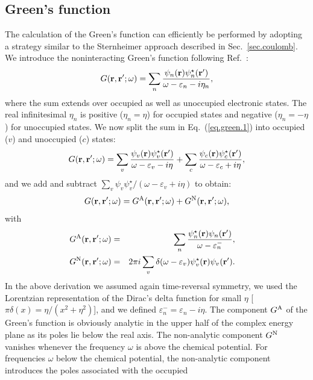 \documentclass[twocolumn,prb,showpacs,superscriptaddress]{revtex4}
\def\w{\omega}
\def\E{\varepsilon}
\def\r{{\bf r}}
\def\rp{{\bf r^\prime}}
\begin{document}
\subsection{Green's function}\label{sec.green}

The calculation of the Green's function can efficiently be performed 
by adopting a strategy similar to the Sternheimer approach
described in Sec.\ \ref{sec.coulomb}.
We introduce the noninteracting Green's function following Ref.\ :
  \begin{equation}\label{eq.green.1}
  G(\r,\rp;\w) = \sum_n \frac{\psi_n(\r)\psi_n^\star(\rp)}{\w-\E_n-i\eta_n},
  \end{equation}
where the sum extends over occupied as well as unoccupied electronic states.
The real infinitesimal $\eta_n$ is positive ($\eta_n=\eta$) 
for occupied states and negative ($\eta_n=-\eta$) for unoccupied states.\cite{hl,hl86,note.spinfactor}
We now split the sum in Eq.~(\ref{eq.green.1}) into occupied ($v$) and unoccupied ($c$) states:
  \begin{equation}\label{eq.green.2}
  G(\r,\rp;\w) = \sum_v \frac{\psi_v(\r)\psi_v^\star(\rp)}{\w-\E_v-i\eta}
  + \sum_c \frac{\psi_c(\r)\psi_c^\star(\rp)}{\w-\E_c+i\eta},
  \end{equation}
and we add and subtract $\sum_v \psi_v\psi_v^\star/(\w-\E_v+i\eta)$ to obtain:
  \begin{equation}\label{eq.green.split}
  G(\r,\rp;\w) = G^{\rm A}(\r,\rp;\w) + G^{\rm N}(\r,\rp;\w),
  \end{equation}
with
  \begin{eqnarray}\label{eq.green.split.2}
\!\!\!\!\!\!  G^{\rm A}(\r,\rp;\w) & =&  \sum_n \frac{\psi_n^\star(\r)\psi_n(\rp)}{\w-\E_n^-},  \\ 
\!\!\!\!\!\!  G^{\rm N}(\r,\rp;\w)  & = &  2\pi i \sum_v \delta(\w-\E_v) \psi_v^\star(\r)\psi_v(\rp). \label{eq.green.split.3} 
  \end{eqnarray}
In the above derivation we assumed again time-reversal symmetry, we used the Lorentzian representation of the Dirac's delta function 
for small $\eta$ [$\pi\delta(x)=\eta/(x^2+\eta^2)$], and we defined $\E_n^- = \E_n - i\eta$.
The component $G^{\rm A}$ of the Green's function is obviously analytic in the
upper half of the complex energy plane as its poles lie below the real axis.
The non-analytic component $G^{\rm N}$ vanishes
whenever the frequency $\w$ is above the chemical potential. For frequencies $\w$
below the chemical potential, the non-analytic component introduces the poles associated with the occupied 
\end{document}
